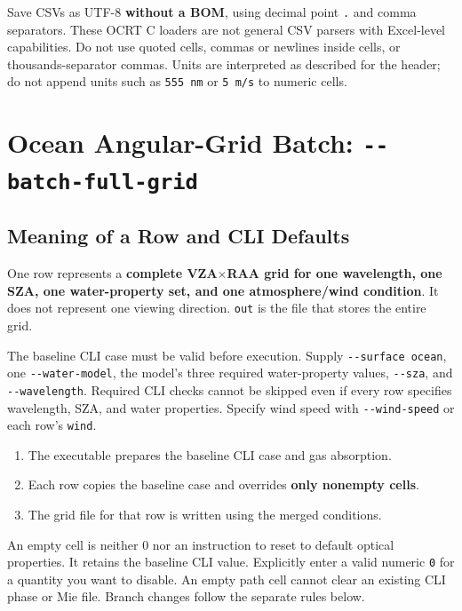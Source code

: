Save CSVs as UTF-8 \textbf{without a BOM}, using decimal point \texttt{.\allowbreak{}} and comma separators. These OCRT C loaders are not general CSV parsers with Excel-level capabilities. Do not use quoted cells, commas or newlines inside cells, or thousands-separator commas. Units are interpreted as described for the header; do not append units such as \texttt{555 nm} or \texttt{5 m/\allowbreak{}s} to numeric cells.

\section{Ocean Angular-Grid Batch: \texttt{-\allowbreak{}-\allowbreak{}batch-\allowbreak{}full-\allowbreak{}grid}}
\label{sec:auto:08_input_formats:2}
\subsection{Meaning of a Row and CLI Defaults}
\label{sec:auto:08_input_formats:2.1}
One row represents a \textbf{complete VZA\ensuremath{\times}RAA grid for one wavelength, one SZA, one water-property set, and one atmosphere/wind condition}. It does not represent one viewing direction. \texttt{out} is the file that stores the entire grid.

The baseline CLI case must be valid before execution. Supply \texttt{-\allowbreak{}-\allowbreak{}surface ocean}, one \texttt{-\allowbreak{}-\allowbreak{}water-\allowbreak{}model}, the model's three required water-property values, \texttt{-\allowbreak{}-\allowbreak{}sza}, and \texttt{-\allowbreak{}-\allowbreak{}wavelength}. Required CLI checks cannot be skipped even if every row specifies wavelength, SZA, and water properties. Specify wind speed with \texttt{-\allowbreak{}-\allowbreak{}wind-\allowbreak{}speed} or each row's \texttt{wind}.

\begin{enumerate}
\item The executable prepares the baseline CLI case and gas absorption.
\item Each row copies the baseline case and overrides \textbf{only nonempty cells}.
\item The grid file for that row is written using the merged conditions.
\end{enumerate}

An empty cell is neither 0 nor an instruction to reset to default optical properties. It retains the baseline CLI value. Explicitly enter a valid numeric \texttt{0} for a quantity you want to disable. An empty path cell cannot clear an existing CLI phase or Mie file. Branch changes follow the separate rules below.

